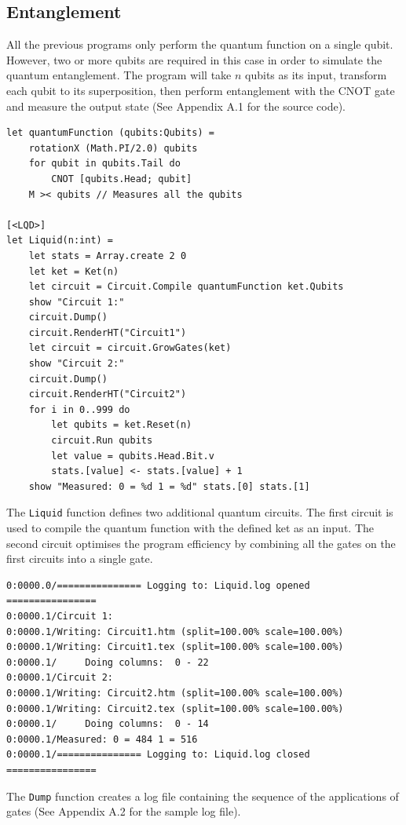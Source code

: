 \documentclass[12pt]{third-rep}
\begin{document}
\subsection{Entanglement}
All the previous programs only perform the quantum function on a single qubit. However, two or more qubits are required in this case in order to simulate the quantum entanglement. The program will take $n$ qubits as its input, transform each qubit to its superposition, then perform entanglement with the CNOT gate and measure the output state (See Appendix A.1 for the source code).
\begin{verbatim}
let quantumFunction (qubits:Qubits) =
    rotationX (Math.PI/2.0) qubits
    for qubit in qubits.Tail do 
        CNOT [qubits.Head; qubit]
    M >< qubits // Measures all the qubits

[<LQD>]
let Liquid(n:int) =
    let stats = Array.create 2 0
    let ket = Ket(n)
    let circuit = Circuit.Compile quantumFunction ket.Qubits
    show "Circuit 1:"
    circuit.Dump()
    circuit.RenderHT("Circuit1")
    let circuit = circuit.GrowGates(ket)
    show "Circuit 2:"
    circuit.Dump()
    circuit.RenderHT("Circuit2")
    for i in 0..999 do
        let qubits = ket.Reset(n) 
        circuit.Run qubits
        let value = qubits.Head.Bit.v
        stats.[value] <- stats.[value] + 1
    show "Measured: 0 = %d 1 = %d" stats.[0] stats.[1]
\end{verbatim}
The \texttt{Liquid} function defines two additional quantum circuits. The first circuit is used to compile the quantum function with the defined ket as an input. The second circuit optimises the program efficiency by combining all the gates on the first circuits into a single gate.
\begin{verbatim}
0:0000.0/=============== Logging to: Liquid.log opened ================
0:0000.1/Circuit 1:
0:0000.1/Writing: Circuit1.htm (split=100.00% scale=100.00%)
0:0000.1/Writing: Circuit1.tex (split=100.00% scale=100.00%)
0:0000.1/     Doing columns:  0 - 22
0:0000.1/Circuit 2:
0:0000.1/Writing: Circuit2.htm (split=100.00% scale=100.00%)
0:0000.1/Writing: Circuit2.tex (split=100.00% scale=100.00%)
0:0000.1/     Doing columns:  0 - 14
0:0000.1/Measured: 0 = 484 1 = 516
0:0000.1/=============== Logging to: Liquid.log closed ================
\end{verbatim}
The \texttt{Dump} function creates a log file containing the sequence of the applications of gates (See Appendix A.2 for the sample log file). \\\\
\end{document}
